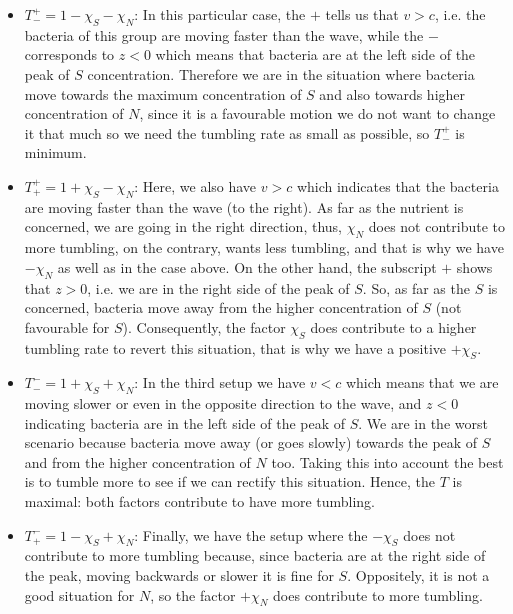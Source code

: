 \documentclass[11pt,twoside]{article}
\theoremstyle{plain}
\theoremstyle{nonumberplain}
\begin{document}
\begin{itemize}
    \item $T^+_- = 1-\chi_S-\chi_N$: In this particular case, the $+$ tells us that $v>c$, i.e. the bacteria of this group are moving faster than the wave, while the $-$ corresponds to $z<0$ which means that bacteria are at the left side of the peak of $S$ concentration. Therefore we are in the situation where bacteria move towards the maximum concentration of $S$ and also towards higher concentration of $N$, since it is a favourable motion we do not want to change it that much so we need the tumbling rate as small as possible, so $T^+_-$ is minimum.
    \item $T^+_+ = 1+\chi_S-\chi_N$: Here, we also have $v>c$ which indicates that the bacteria are moving faster than the wave (to the right). As far as the nutrient is concerned, we are going in the right direction, thus, $\chi_N$ does not contribute to more tumbling, on the contrary, wants less tumbling, and that is why we have $-\chi_N$ as well as in the case above. On the other hand, the subscript $+$ shows that $z>0$, i.e. we are in the right side of the peak of $S$. So, as far as the $S$ is concerned, bacteria move away from the higher concentration of $S$ (not favourable for $S$). Consequently, the factor $\chi_S$ does contribute to a higher tumbling rate to revert this situation, that is why we have a positive $+\chi_S$.

    \item $T^-_- = 1+\chi_S+\chi_N$: In the third setup we have $v<c$ which means that we are moving slower or even in the opposite direction to the wave, and $z<0$ indicating bacteria are in the left side of the peak of $S$. We are in the worst scenario because bacteria move away (or goes slowly) towards the peak of $S$ and from the higher concentration of $N$ too. Taking this into account the best is to tumble more to see if we can rectify this situation. Hence, the $T$ is maximal: both factors contribute to have more tumbling.

    \item $T^-_+ = 1-\chi_S+\chi_N$: Finally, we have the setup where the $-\chi_S$ does not contribute to more tumbling because, since bacteria are at the right side of the peak, moving backwards or slower it is fine for $S$. Oppositely, it is not a good situation for $N$, so the factor $+\chi_N$ does contribute to more tumbling.
\end{itemize}
\end{document}
